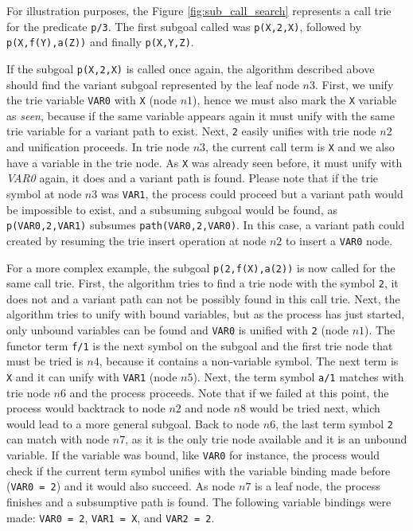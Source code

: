For illustration purposes, the Figure \ref{fig:sub_call_search} represents a call trie for the predicate \texttt{p/3}.
The first subgoal called was \texttt{p(X,2,X)}, followed by \texttt{p(X,f(Y),a(Z))} and finally \texttt{p(X,Y,Z)}.

If the subgoal \texttt{p(X,2,X)} is called once again, the algorithm described above
should find the variant subgoal represented by the leaf node $n3$. First, we unify the trie variable
\texttt{VAR0} with \texttt{X} (node $n1$), hence we must also mark the \texttt{X} variable as \textit{seen},
because if the same variable appears again it must unify with the same trie variable for a variant path
to exist. Next, \texttt{2} easily unifies with trie node $n2$ and unification proceeds. In trie node $n3$,
the current call term is \texttt{X} and we also have a variable in the trie node. As \texttt{X} was already seen before,
it must unify with \textit{VAR0} again, it does and a variant path is found. Please note that if
the trie symbol at node $n3$ was \texttt{VAR1}, the process could proceed but a variant path would be impossible
to exist, and a subsuming subgoal would be found, as \texttt{p(VAR0,2,VAR1)} subsumes \texttt{path(VAR0,2,VAR0)}.
In this case, a variant path could created by resuming the trie insert operation at node $n2$ to insert
a \texttt{VAR0} node.

For a more complex example, the subgoal \texttt{p(2,f(X),a(2))} is now called for the same call trie. First,
the algorithm tries to find a trie node with the symbol \texttt{2}, it does not and a variant path
can not be possibly found in this call trie. Next, the algorithm tries to unify with bound variables, but as the process
has just started, only unbound variables can be found and \texttt{VAR0} is unified with \texttt{2} (node $n1$).
The functor term \texttt{f/1} is the next symbol on the subgoal and the first trie node that must be tried is $n4$,
because it contains a non-variable symbol. The next term is \texttt{X} and it can unify with \texttt{VAR1} (node $n5$).
Next, the term symbol \texttt{a/1} matches with trie node $n6$ and the process proceeds. Note that if we failed
at this point, the process would backtrack to node $n2$ and node $n8$ would be tried next, which would
lead to a more general subgoal. Back to node $n6$, the last term symbol \texttt{2} can match with node $n7$, as it is the only trie
node available and it is an unbound variable. If the variable was bound, like \texttt{VAR0} for instance,
the process would check if the current term symbol unifies with the variable binding made before (\texttt{VAR0 = 2}) and
it would also succeed. As node $n7$ is a leaf node, the process finishes and a subsumptive path is found.
The following variable bindings were made: \texttt{VAR0 = 2}, \texttt{VAR1 = X}, and \texttt{VAR2 = 2}.
